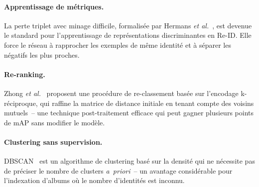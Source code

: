 \paragraph{Apprentissage de métriques.}
La perte triplet avec minage difficile, formalisée par Hermans \textit{et al.}~\cite{hermans2017defense}, est devenue le standard pour l'apprentissage de représentations discriminantes en Re-ID. Elle force le réseau à rapprocher les exemples de même identité et à séparer les négatifs les plus proches.

\paragraph{Re-ranking.}
Zhong \textit{et al.}~\cite{zhong2017re} proposent une procédure de re-classement basée sur l'encodage k-réciproque, qui raffine la matrice de distance initiale en tenant compte des voisins mutuels~-- une technique post-traitement efficace qui peut gagner plusieurs points de mAP sans modifier le modèle.

\paragraph{Clustering sans supervision.}
DBSCAN~\cite{ester1996density} est un algorithme de clustering basé sur la densité qui ne nécessite pas de préciser le nombre de clusters \textit{a~priori}~-- un avantage considérable pour l'indexation d'albums o\`{u} le nombre d'identités est inconnu.
